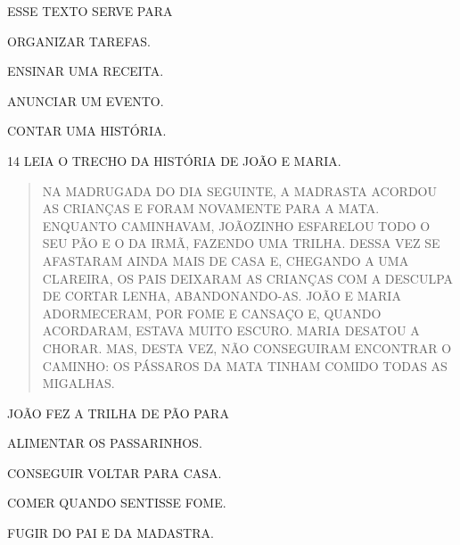 
ESSE TEXTO SERVE PARA

\begin{escolha}
\item ORGANIZAR TAREFAS.

\item ENSINAR UMA RECEITA.

\item ANUNCIAR UM EVENTO.

\item CONTAR UMA HISTÓRIA.
\end{escolha}

\num{14} LEIA O TRECHO DA HISTÓRIA DE JOÃO E MARIA.

\begin{quote}
NA MADRUGADA DO DIA SEGUINTE, A MADRASTA ACORDOU AS CRIANÇAS E FORAM
NOVAMENTE PARA A MATA. ENQUANTO CAMINHAVAM, JOÃOZINHO ESFARELOU TODO O
SEU PÃO E O DA IRMÃ, FAZENDO UMA TRILHA. DESSA VEZ SE AFASTARAM AINDA
MAIS DE CASA E, CHEGANDO A UMA CLAREIRA, OS PAIS DEIXARAM AS CRIANÇAS
COM A DESCULPA DE CORTAR LENHA, ABANDONANDO-AS. JOÃO E MARIA
ADORMECERAM, POR FOME E CANSAÇO E, QUANDO ACORDARAM, ESTAVA MUITO
ESCURO. MARIA DESATOU A CHORAR. MAS, DESTA VEZ, NÃO CONSEGUIRAM
ENCONTRAR O CAMINHO: OS PÁSSAROS DA MATA TINHAM COMIDO TODAS AS
MIGALHAS.

\end{quote}

JOÃO FEZ A TRILHA DE PÃO PARA

\begin{escolha}
\item ALIMENTAR OS PASSARINHOS.

\item CONSEGUIR VOLTAR PARA CASA.

\item COMER QUANDO SENTISSE FOME.

\item FUGIR DO PAI E DA MADASTRA.
\end{escolha}

